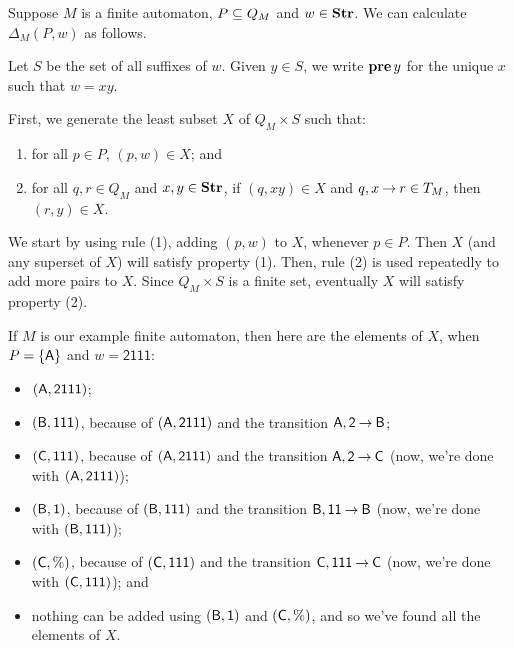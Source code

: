 Suppose $M$ is a finite automaton, $P\subseteq Q_M$ and $w\in \mathbf{Str}$.
We can calculate $\Delta_M(P,w)$ as follows.
%
%
%

Let $S$ be the set of all suffixes of $w$.  Given $y\in S$, we write
$\mathbf{pre}\,y$ for the unique $x$ such that $w=xy$.

First, we generate the least subset $X$ of $Q_M\times S$ such that:
\begin{enumerate}[(1)]
\item for all $p\in P$, $(p,w)\in X$; and

\item for all $q,r\in Q_M$ and $x,y\in\mathbf{Str}$, if
$(q,xy)\in X$ and $q,x\mathbin{\to} r\in T_M$, then
$(r,y)\in X$.
\end{enumerate}
We start by using rule (1), adding $(p,w)$ to $X$, whenever $p\in P$.
Then $X$ (and any superset of $X$) will satisfy property (1).
Then, rule (2) is used repeatedly to add more pairs to $X$.  Since
$Q_M\times S$ is a finite set, eventually $X$ will satisfy property (2).

If $M$ is our example finite automaton, then here are the elements of
$X$, when $P=\{\mathsf{A}\}$ and $w=\mathsf{2111}$:
\begin{itemize}
\item $(\mathsf{A},\mathsf{2111})$;

\item $(\mathsf{B},\mathsf{111})$, because of $(\mathsf{A},\mathsf{2111})$ and the
  transition $\mathsf{A},\mathsf{2}\mathbin{\to}\mathsf{B}$;

\item $(\mathsf{C}, \mathsf{111})$, because of $(\mathsf{A},\mathsf{2111})$ and
  the transition $\mathsf{A},\mathsf{2}\mathbin{\to}\mathsf{C}$ (now, we're done with
  $(\mathsf{A},\mathsf{2111})$);

\item $(\mathsf{B},\mathsf{1})$, because of $(\mathsf{B},\mathsf{111})$ and the
  transition $\mathsf{B},\mathsf{11}\mathbin{\to}\mathsf{B}$ (now, we're done with
  $(\mathsf{B},\mathsf{111})$);

\item $(\mathsf{C}, \%)$, because of $(\mathsf{C}, \mathsf{111})$ and the
  transition $\mathsf{C},\mathsf{111}\mathbin{\to}\mathsf{C}$ (now, we're done with $(\mathsf{C},
  \mathsf{111})$); and

\item nothing can be added using $(\mathsf{B},\mathsf{1})$ and $(\mathsf{C}, \%)$,
and so we've found all the elements of $X$.
\end{itemize}

